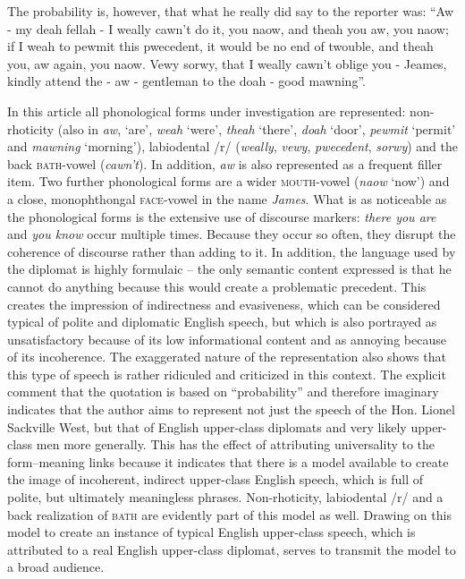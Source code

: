 \begin{ipquote}
The probability is, however, that what he really did say to the reporter was: “Aw - my deah fellah - I weally cawn't do it, you naow, and theah you aw, you naow; if I weah to pewmit this pwecedent, it would be no end of twouble, and theah you, aw again, you naow. Vewy sorwy, that I weally cawn't oblige you - Jeames, kindly attend the  {}- aw - gentleman to the doah - good mawning”.
\end{ipquote}

In this article all phonological forms under investigation are represented: non-rhoticity (also in \emph{aw}, ‘are’, \emph{weah} ‘were’, \emph{theah} ‘there’, \emph{doah} ‘door’, \emph{pewmit} ‘permit’ and \emph{mawning} ‘morning’), labiodental /r/ (\emph{weally}, \emph{vewy}, \emph{pwecedent}, \emph{sorwy}) and the back \textsc{bath}{}-vowel (\emph{cawn’t}). In addition, \emph{aw} is also represented as a frequent filler item. Two further phonological forms are a wider \textsc{mouth}{}-vowel (\emph{naow} ‘now’) and a close, monophthongal \textsc{face}{}-vowel in the name \emph{James}. What is as noticeable as the phonological forms is the extensive use of discourse markers: \emph{there you are} and \emph{you know} occur multiple times. Because they occur so often, they disrupt the coherence of discourse rather than adding to it. In addition, the language used by the diplomat is highly formulaic – the only semantic content expressed is that he cannot do anything because this would create a problematic precedent. This creates the impression of indirectness and evasiveness, which can be considered typical of polite and diplomatic English speech, but which is also portrayed as unsatisfactory because of its low informational content and as annoying because of its incoherence. The exaggerated nature of the representation also shows that this type of speech is rather ridiculed and criticized in this context. The explicit comment that the quotation is based on “probability” and therefore imaginary indicates that the author aims to represent not just the speech of the Hon. Lionel Sackville West, but that of English upper-class diplomats and very likely upper-class men more generally. This has the effect of attributing universality to the form–meaning links because it indicates that there is a model available to create the image of incoherent, indirect upper-class English speech, which is full of polite, but ultimately meaningless phrases. Non-rhoticity, labiodental /r/ and a back realization of \textsc{bath} are evidently part of this model as well. Drawing on this model to create an instance of typical English upper-class speech, which is attributed to a real English upper-class diplomat, serves to transmit the model to a broad audience.

